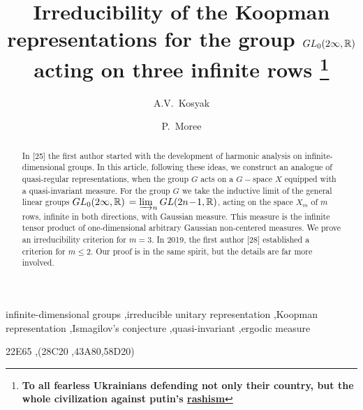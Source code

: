 \documentclass[preprint,12pt]{elsarticle}
\numberwithin{equation}{section}
\begin{document}
\begin{frontmatter}



\title{Irreducibility of the Koopman representations for the group ${\rm GL}_0(2\infty,{\mathbb R})$
acting on  three infinite rows
%
\footnote{\bf To all fearless Ukrainians defending not only their country, but the whole civilization 
against putin's 
\href{https://en.wikipedia.org/wiki/Ruscism}{rashism}
}
}
%


\author{A.V.~Kosyak}
\address{Institute of Mathematics, Ukrainian National Academy of Sciences,\\
3 Tereshchenkivs'ka Str., Kyiv, 01601, Ukraine}

\address{
London Institute for Mathematical Sciences,\\
21 Albemarle St, London W1S 4BS, UK
}



\author{P.~Moree}
\address{Max-Planck-Institut f\"ur Mathematik, Vivatsgasse 7, D-53111 Bonn, Germany}
\begin{abstract}
In [25] the first author started with the development of harmonic analysis on infinite-dimensional groups.  
In this article,  following these ideas, we construct an analogue of quasi-regular representations, when the group $G$ acts on
a $G-$space $X$ equipped with a quasi-invariant measure. For the group $G$ we
take
the inductive limit of the general linear
groups  ${\rm
GL}_0(2\infty,{\mathbb R})$ $= \varinjlim_{n}{\rm
GL}(2n\!-\!1,{\mathbb R})$,
acting on the space $X_m$  of $m$ rows, infinite in both
directions,   with Gaussian measure.  This measure is the infinite tensor product of
one-dimensional arbitrary Gaussian non-centered measures. 
We prove an irreducibility criterion for $m\!=\!3$. In 2019, the first
author [28] established a criterion for $m\!\le\! 2$. Our proof is in the same spirit,
but the details are far more involved.
\end{abstract}

\begin{keyword}
infinite-dimensional groups
 \sep irreducible unitary representation
\sep Koopman representation \sep Ismagilov's conjecture 
\sep quasi-invariant  \sep ergodic measure


\MSC[2008] 22E65 \sep (28C20 \sep 43A80\sep 58D20)
\end{keyword}



\end{frontmatter}
\end{document}
